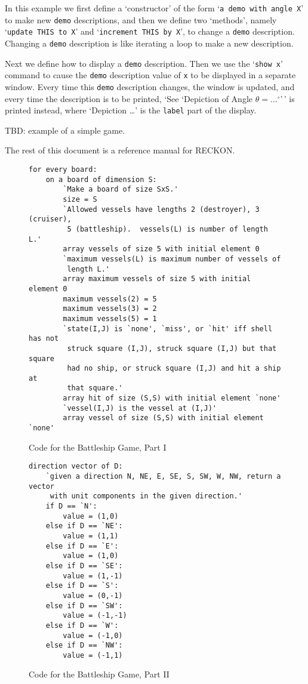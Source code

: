 \documentclass[12pt]{article}
\newlength{\figurewidth}
\newenvironment{boxedfigure}[1][!btp]%
	{\begin{figure*}[#1]
	 \begin{lrbox}{\figurebox}
	 \begin{minipage}{\figurewidth}

	 \vspace*{1ex}}%
	{
	 \vspace*{1ex}

	 \end{minipage}
	 \end{lrbox}
	 \begin{center}
	 \fbox{\hspace*{0.1in}\usebox{\figurebox}\hspace*{0.1in}}
	 \end{center}
	 \end{figure*}}
\begin{document}
In this example we first define a `constructor'
of the form `{\tt a demo with angle X}' to make new {\tt demo} descriptions,
and then we define two `methods', namely `{\tt update THIS to X}' and
`{\tt in\-cre\-ment THIS by X}', to change a {\tt demo} description.  Changing
a {\tt demo} description is like iterating a loop to make a new description.

Next we define how to display a {\tt demo} description.  Then we use the
`{\tt show x}' command
to cause the {\tt demo} description value of {\tt x}
to be displayed in a separate window.
Every time this {\tt demo} description
changes, the window is updated, and every time the description
is to be printed,
`See `Depiction of Angle $\theta=\ldots^\circ$'\,'
is printed instead, where `Depiction \ldots' is the {\tt label} part of
the display.


TBD: example of a simple game.

The rest of this document is a reference manual for RECKON.

\begin{boxedfigure}

\begin{verbatim}
for every board:
    on a board of dimension S:
        `Make a board of size SxS.'
        size = S
        `Allowed vessels have lengths 2 (destroyer), 3 (cruiser),
         5 (battleship).  vessels(L) is number of length L.'
        array vessels of size 5 with initial element 0
        `maximum vessels(L) is maximum number of vessels of
         length L.'
        array maximum vessels of size 5 with initial element 0
        maximum vessels(2) = 5
        maximum vessels(3) = 2
        maximum vessels(5) = 1
        `state(I,J) is `none', `miss', or `hit' iff shell has not
         struck square (I,J), struck square (I,J) but that square
         had no ship, or struck square (I,J) and hit a ship at
         that square.'
        array hit of size (S,S) with initial element `none'
        `vessel(I,J) is the vessel at (I,J)'
        array vessel of size (S,S) with initial element `none'
\end{verbatim}

\caption{Code for the Battleship Game, Part I}
\label{CODE-FOR-BATTLESHIP-1}
\end{boxedfigure}


\begin{boxedfigure}

\begin{verbatim}
direction vector of D:
    `given a direction N, NE, E, SE, S, SW, W, NW, return a vector
     with unit components in the given direction.'
    if D == `N':
        value = (1,0)
    else if D == `NE':
        value = (1,1)
    else if D == `E':
        value = (1,0)
    else if D == `SE':
        value = (1,-1)
    else if D == `S':
        value = (0,-1)
    else if D == `SW':
        value = (-1,-1)
    else if D == `W':
        value = (-1,0)
    else if D == `NW':
        value = (-1,1)
\end{verbatim}

\caption{Code for the Battleship Game, Part II}
\label{CODE-FOR-BATTLESHIP-2}
\end{boxedfigure}
\end{document}
